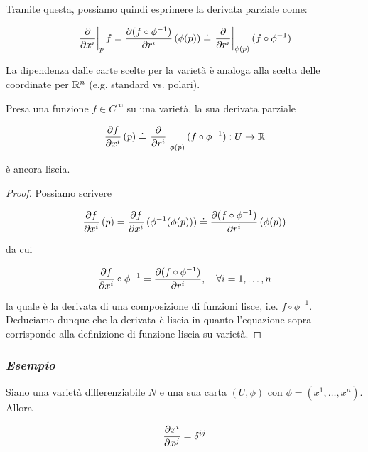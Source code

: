 Tramite questa, possiamo quindi esprimere la derivata parziale come:

\begin{equation}
	\eval{ \pdv{x^{i}} }_{p} f = \pdv{(f \circ \phi^{-1})}{r^{i}} \, (\phi(p)) %
	\doteq \eval{ \pdv{r^{i}} }_{\phi(p)} (f \circ \phi^{-1})
\end{equation}

La dipendenza dalle carte scelte per la varietà è analoga alla scelta delle coordinate per $ \mathbb{R}^{n} $ (e.g. standard vs. polari).

\begin{definition}
	Presa una funzione $ f \in C^{\infty} $ su una varietà, la sua derivata parziale
	
	\begin{equation}
		\pdv{f}{x^{i}} \, (p) \doteq \eval{ \pdv{r^{i}} }_{\phi(p)} (f \circ \phi^{-1}) : U \to \R
	\end{equation}

	è ancora liscia.
\end{definition}

\begin{proof}
	Possiamo scrivere
	
	\begin{equation}
		\pdv{f}{x^{i}} \, (p) = \pdv{f}{x^{i}} \, (\phi^{-1}(\phi(p))) %
		\doteq \pdv{(f \circ \phi^{-1})}{r^{i}} \, (\phi(p))
	\end{equation}

	da cui
	
	\begin{equation}
		\pdv{f}{x^{i}} \circ \phi^{-1} = \pdv{(f \circ \phi^{-1})}{r^{i}} \qcomma \forall i=1,\dots,n
	\end{equation}

	la quale è la derivata di una composizione di funzioni lisce, i.e. $ f \circ \phi^{-1} $. Deduciamo dunque che la derivata è liscia in quanto l'equazione sopra corrisponde alla definizione di funzione liscia su varietà.
\end{proof}

\subsubsection{\textit{Esempio}}

Siano una varietà differenziabile $ N $ e una sua carta $ (U,\phi) $ con $ \phi = (x^{1},\dots,x^{n}) $. Allora

\begin{equation}
	\pdv{x^{i}}{x^{j}} = \delta^{ij}
\end{equation}

